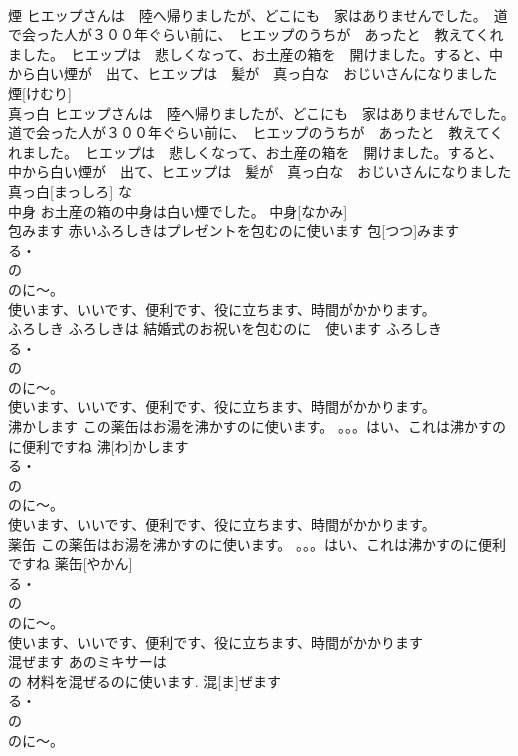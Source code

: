 \documentclass[8pt]{extreport}
\begin{document}
\begin{CJK}{UTF8}{min}
\\	煙	ヒエップさんは　陸へ帰りましたが、どこにも　家はありませんでした。　道で会った人が３００年ぐらい前に、　ヒエップのうちが　あったと　教えてくれました。　ヒエップは　悲しくなって、お土産の箱を　開けました。すると、中から白い煙が　出て、ヒエップは　髪が　真っ白な　おじいさんになりました	煙[けむり]					
\\	真っ白	ヒエップさんは　陸へ帰りましたが、どこにも　家はありませんでした。　道で会った人が３００年ぐらい前に、　ヒエップのうちが　あったと　教えてくれました。　ヒエップは　悲しくなって、お土産の箱を　開けました。すると、中から白い煙が　出て、ヒエップは　髪が　真っ白な　おじいさんになりました	真っ白[まっしろ]				な	
\\	中身	お土産の箱の中身は白い煙でした。	中身[なかみ]					
\\	包みます	赤いふろしきはプレゼントを包むのに使います	包[つつ]みます			
\\	る・
\\	の　
\\	のに～。
\\	使います、いいです、便利です、役に立ちます、時間がかかります。	
\\	ふろしき	ふろしきは 結婚式のお祝いを包むのに　使います	ふろしき				
\\	る・
\\	の　
\\	のに～。
\\	使います、いいです、便利です、役に立ちます、時間がかかります。		
\\	沸かします	この薬缶はお湯を沸かすのに使います。 。。。はい、これは沸かすのに便利ですね	沸[わ]かします			
\\	る・
\\	の　
\\	のに～。
\\	使います、いいです、便利です、役に立ちます、時間がかかります。	
\\	薬缶	この薬缶はお湯を沸かすのに使います。 。。。はい、これは沸かすのに便利ですね	薬缶[やかん]			
\\	る・
\\	の　
\\	のに～。
\\	使います、いいです、便利です、役に立ちます、時間がかかります	
\\	混ぜます	あのミキサーは　 
\\	の 材料を混ぜるのに使います.	混[ま]ぜます			
\\	る・
\\	の　
\\	のに～。

\end{CJK}
\end{document}
